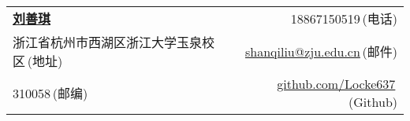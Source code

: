 \newcommand{\paint}[3]{
    \begin{minipage}{#1}
        \texttt{[image: \#3]}
    \end{minipage}
}
\newcommand{\myheader}{
    \begin{tabular*}{\textwidth}{l@{\extracolsep{\fill}}r}
        \specialrule{0em}{4pt}{4pt}
        \textbf{\href{http://wenlc.cn/cv}{\LARGE 刘善琪}} & 18867150519$\,${\color{labelgrey}(电话)}\\
        浙江省杭州市西湖区浙江大学玉泉校区$\,${\color{labelgrey}(地址)} &\href{mailto:shanqiliu@zju.edu.cn}{shanqiliu@zju.edu.cn}$\,${\color{labelgrey}(邮件)} \\
        310058$\,${\color{labelgrey}(邮编)} & \href{https://github.com/Locke637}{github.com/Locke637}$\,${\color{labelgrey}(Github)} \\
    \end{tabular*}\\

}

\myheader

